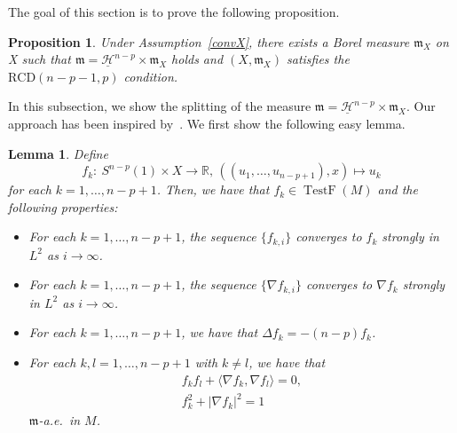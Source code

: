 \documentclass[10pt,a4paper]{amsart}
\numberwithin{equation}{section}
\newtheorem{Prop}[Thm]{Proposition}
\newtheorem{Lem}[Thm]{Lemma}
\theoremstyle{definition}
\newcommand{\TestF}{\operatorname{TestF}}
\newcommand{\R}{\mathbb{R}}
\newcommand{\mf}{\mathfrak{m}}
\newcommand{\nHa}{\underline{\mathcal{H}}}
\begin{document}
The goal of this section is to prove the following proposition.
\begin{Prop}\label{strX}
Under Assumption~{\rm \ref{convX}}, there exists a Borel measure $\mf_X$ on X such that $\mf=\nHa^{n-p}\times \mf_X$ holds and $(X,\mf_X)$ satisfies the $\mathrm{RCD}(n-p-1,p)$ condition.
\end{Prop}
In this subsection, we show the splitting of the measure $\mf=\nHa^{n-p}\times \mf_X$.
Our approach has been inspired by~\cite{GR2018}.
We first show the following easy lemma.
\begin{Lem}\label{hfun}
Define
\[
f_k\colon\ S^{n-p}(1)\times X\to \R,\, ((u_1,\ldots,u_{n-p+1}),x)\mapsto u_k
\]
for each $k=1,\ldots, n-p+1$.
Then, we have that $f_k \in\TestF(M)$ and the following properties:
\begin{itemize}\itemsep=0pt
\item[$(i)$] For each $k=1,\ldots,n-p+1$, the sequence $\{f_{k,i}\}$ converges to $f_k$ strongly in $L^2$ as $i\to\infty$.
\item[$(ii)$] For each $k=1,\ldots,n-p+1$, the sequence $\{\nabla f_{k,i}\}$ converges to $\nabla f_k$ strongly in $L^2$ as $i\to\infty$.
\item[$(iii)$] For each $k=1,\ldots,n-p+1$, we have that $\Delta f_k= -(n-p)f_k$.
\item[$(iv)$] For each $k,l=1,\ldots,n-p+1$ with $k\neq l$, we have that
\begin{gather*}
f_k f_l +\langle\nabla f_k,\nabla f_l\rangle=0,
\\
f_k^2+|\nabla f_k|^2=1
\end{gather*}
$\mf$-a.e.\ in $M$.
\end{itemize}
\end{Lem}
\end{document}
